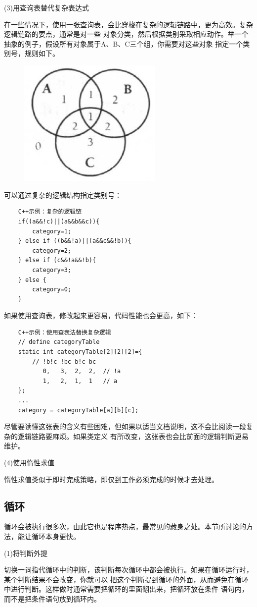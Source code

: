 \documentclass{article}
\begin{document}
\par
(3)用查询表替代复杂表达式
\par
在一些情况下，使用一张查询表，会比穿梭在复杂的逻辑链路中，更为高效。复杂逻辑链路的要点，通常是对一些
对象分类，然后根据类别采取相应动作。举一个抽象的例子，假设所有对象属于A、B、C三个组，你需要对这些对象
指定一个类别号，规则如下。
\begin{figure}[htb]
    \centering
    \includegraphics[width=7cm]{figure21.png}
\end{figure}
可以通过复杂的逻辑结构指定类别号：
\begin{lstlisting}
    C++示例：复杂的逻辑链
    if((a&&!c)||(a&&b&&c)){
        category=1;
    } else if ((b&&!a)||(a&&c&&!b)){
        category=2;
    } else if (c&&!a&&!b){
        category=3;
    } else {
        category=0;
    }
\end{lstlisting}
如果使用查询表，修改起来更容易，代码性能也会更高，如下：
\begin{lstlisting}
    C++示例：使用查表法替换复杂逻辑
    // define categoryTable
    static int categoryTable[2][2][2]={
        // !b!c !bc b!c bc
           0,   3,  2,  2,  // !a
           1,   2,  1,  1   // a
    };
    ...
    category = categoryTable[a][b][c];
\end{lstlisting}
尽管要读懂这张表的含义有些困难，但如果以适当文档说明，这不会比阅读一段复杂的逻辑链路要麻烦。如果类定义
有所改变，这张表也会比前面的逻辑判断更易维护。

\par
(4)使用惰性求值
\par
惰性求值类似于即时完成策略，即仅到工作必须完成的时候才去处理。

\subsection{循环}
循环会被执行很多次，由此它也是程序热点，最常见的藏身之处。本节所讨论的方法，能让循环本身更快。
\par
(1)将判断外提
\par
切换一词指代循环中的判断，该判断每次循环中都会被执行。如果在循环运行时，某个判断结果不会改变，你就可以
把这个判断提到循环的外面，从而避免在循环中进行判断。这样做时通常需要把循环的里面翻出来，把循环放在条件
语句内，而不是把条件语句放到循环内。
\end{document}
